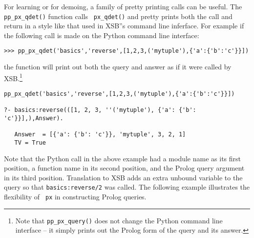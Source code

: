 \begin{example}
For learning \px{} or for demoing, a family of pretty printing calls
can be useful.  The {\tt pp\_px\_qdet()} function calls {\tt
  px\_qdet()} and pretty prints both the call and return in a style
like that used in XSB''s command line inferface.  For example if the
following call is made on the Python command line interface:

\begin{verbatim}
>>> pp_px_qdet('basics','reverse',[1,2,3,('mytuple'),{'a':{'b':'c'}}])
\end{verbatim}
\noindent
the function will print out both the query and answer as if it were
called by XSB.\footnote{Note that {\tt pp\_px\_query()} does not
  change the Python command line interface -- it simply prints out the
  Prolog form of the query and its answer.}

\begin{verbatim}
pp_px_qdet('basics','reverse',[1,2,3,('mytuple'),{'a':{'b':'c'}}])

?- basics:reverse(([1, 2, 3, ''('mytuple'), {'a': {'b': 'c'}}],),Answer).

   Answer  = [{'a': {'b': 'c'}}, 'mytuple', 3, 2, 1]
   TV = True
\end{verbatim}
\end{example}

Note that the Python call in the above example had a module name as
its first position, a function name in its second position, and the
Prolog query argument in its third position.  Translation to XSB adds
an extra unbound variable to the query so that {\tt basics:reverse/2}
was called.  The following example illustrates the flexibility of {\tt
  px} in constructing Prolog queries.

